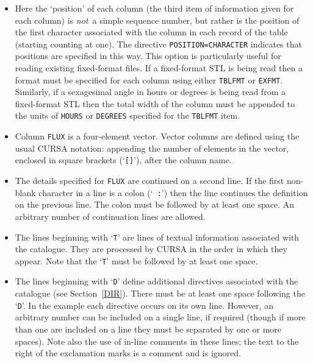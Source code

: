 \documentclass[twoside,11pt]{article}
\renewcommand{\_}{\texttt{\symbol{95}}}
\begin{document}
\begin{itemize}

  \item Here the `position' of each
   column (the third item of information given for each column) is
   {\it not}\, a simple sequence number, but rather is the position
   of the first character associated with the column in each record of the
   table (starting counting at one).  
   The directive {\tt POSITION=CHARACTER} indicates that positions are
   specified in this way.  This option is particularly useful for
   reading existing fixed-format files.  If a fixed-format STL is
   being read then a format must be specified for each column using
   either {\tt TBLFMT} or {\tt EXFMT}.  Similarly, if a sexagesimal
   angle in hours or degrees is being read from a fixed-format STL
   then the total width of the column must be appended to the units
   of {\tt HOURS} or {\tt DEGREES} specified for the {\tt TBLFMT}
   item.

  \item Column {\tt FLUX} is a four-element vector.  Vector columns
   are defined using the usual CURSA notation: appending the number
   of elements in the vector, enclosed in square brackets (`{\tt []}'),
   after the column name.

  \item The details specified for {\tt FLUX} are continued on a second
   line.  If the first non-blank character in a line is a colon (`{\tt
   :}') then the line continues the definition on the previous line.
   The colon must be followed by at least one space.  An arbitrary
   number of continuation lines are allowed.

  \item The lines beginning with `{\tt T}' are lines of textual
   information associated with the catalogue.  They are processed by
   CURSA in the order in which they appear.  Note that the `{\tt T}'
   must be followed by at least one space.

  \item The lines beginning with `{\tt D}' define additional directives
   associated with the catalogue (see Section~\ref{DIR}).  There
   must be at least one space following the `{\tt D}'.  In the
   example each directive occurs on its own line.  However, an arbitrary
   number can be included on a single line, if required (though if more
   than one are included on a line they must be separated by one or
   more spaces).  Note also the use of in-line comments in these lines;
   the text to the right of the exclamation marks is a comment and is
   ignored.


\end{itemize}
\end{document}
